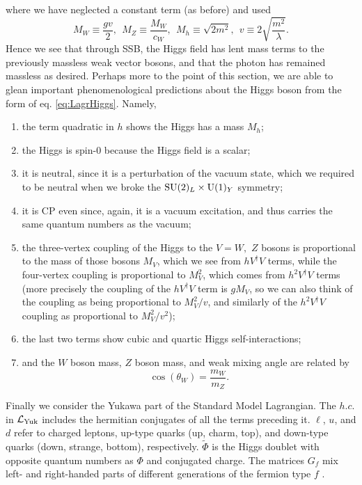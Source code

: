 where we have neglected a constant term (as before) and used
\begin{equation}
  M_W\equiv\frac{gv}{2},\ \ M_Z\equiv\frac{M_W}{c_W},\ \
  M_h\equiv\sqrt{2m^2},\ \ v\equiv 2\sqrt{\frac{m^2}{\lambda}}.
\end{equation}
Hence we see that through SSB, the Higgs field has 
lent mass terms to the previously massless weak vector bosons, and that the 
photon has remained massless as desired. Perhaps more to the point of this 
section, we are able to glean important phenomenological predictions about the 
Higgs boson from the form of eq. \eqref{eq:LagrHiggs}. Namely,
\begin{enumerate}
  \item the term quadratic in $h$ shows the Higgs has a mass $M_h$;
  \item the Higgs is spin-0 because the Higgs field is a scalar;
  \item it is neutral, since it is a perturbation of the vacuum state,
        which we required to be neutral when we broke the 
        $\operatorname{SU}(2)_{L}\times\operatorname{U}(1)_{Y}$ symmetry;
  \item it is CP even since, again, it is a vacuum excitation, and thus 
        carries the same quantum numbers as the vacuum;
  \item the three-vertex coupling of the Higgs to the $V=W,$ $Z$ bosons 
        is proportional to the mass of those bosons $M_V$, which we see from 
        $hV^{\dagger}V$ terms, while the four-vertex coupling is proportional
        to $M_{V}^2$, which comes from $h^{2}V^{\dagger}V$ terms (more
        precisely the coupling of the $hV^{\dagger}V$ term is $gM_{V}$, so we
        can also think of the coupling as being proportional to $M_{V}^{2}/v$,
        and similarly of the $h^{2}V^{\dagger}V$ coupling as proportional
        to $M_{V}^{2}/v^{2}$); 
        \vspace{9mm}
  \item the last two terms show cubic and quartic Higgs self-interactions;
  \item and the $W$ boson mass, $Z$ boson mass, and weak mixing angle are 
        related by $$\cos(\theta_W)=\frac{m_W}{m_Z}.$$
\end{enumerate}

Finally we consider the Yukawa part of the Standard Model Lagrangian. The
$h.c.$ in $\mathcal{L}_{\rm Yuk}$ includes the hermitian conjugates of all the terms
preceding it. $\ell$, $u$, and $d$ refer to charged leptons, up-type quarks
(up, charm, top), and down-type quarks (down, strange, bottom), respectively.
$\widetilde{\Phi}$ is the Higgs doublet with opposite quantum numbers as
$\Phi$ and conjugated charge. The matrices $G_f$ mix left- and right-handed 
parts of different generations of the fermion type $f$ 
\cite{dittmaier_higgs_2013}. 

